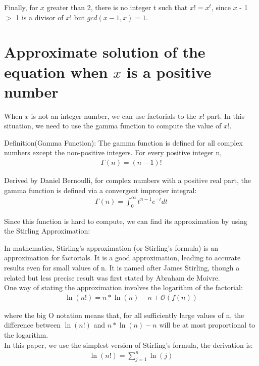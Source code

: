 \documentclass{article}
\begin{document}
        Finally, for $x$ greater than 2, there is no integer t such that $x! = x^t$, since $x$ - 1 $>$ 1 is a divisor of $x$! but $gcd(x-1, x) = 1.$
        
        \section{Approximate solution of the equation when $x$ is a positive number}
        When $x$ is not an integer number, we can use factorials to the $x!$ part. In this situation, we need to use the gamma function to compute the value of $x!$. 

        Definition(Gamma Function): The gamma function is defined for all complex numbers except the non-positive integers. For every positive integer n,
            \begin{align*}
                \Gamma(n) = (n - 1)!
            \end{align*}

        Derived by Daniel Bernoulli, for complex numbers with a positive real part, the gamma function is defined via a convergent improper integral:
            \begin{align*}
                \Gamma(n) = \int_0^\infty t^{n-1} e^{-t} dt 
            \end{align*}

        Since this function is hard to compute, we can find its approximation by using the Stirling Approximation:

        In mathematics, Stirling's approximation (or Stirling's formula) is an approximation for factorials. It is a good approximation, leading to accurate results even for small values of n. It is named after James Stirling, though a related but less precise result was first stated by Abraham de Moivre.\\
        One way of stating the approximation involves the logarithm of the factorial:\\

            \begin{align*}
                \ln(n!) = n * \ln(n) - n + \mathcal{O}(f(n))
            \end{align*}

        where the big O notation means that, for all sufficiently large values of n, the difference between $\ln(n!)$ and $n * \ln(n) - n$ will be at most proportional to the logarithm.\\

        In this paper, we use the simplest version of Stirling's formula, the derivation is:
            \begin{align*}
                \ln(n!) = \sum_{j=1}^{n} \ln(j)
            \end{align*}
        
\end{document}
